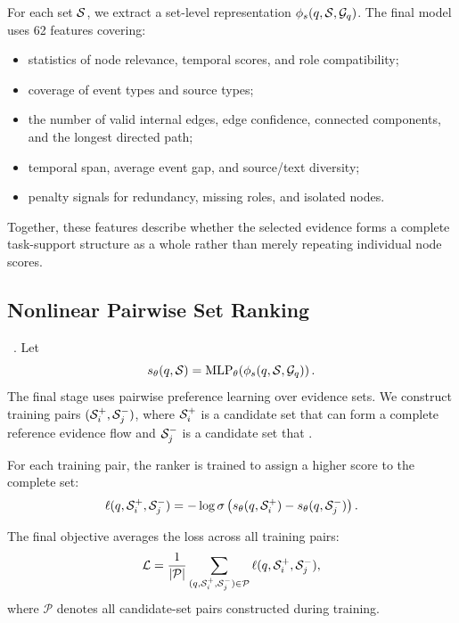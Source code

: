 For each set $\mathcal{S}$, we extract a set-level representation $\phi_s(q,\mathcal{S},\mathcal{G}_q)$. The final model uses 62 features covering:
\begin{itemize}
    \item statistics of node relevance, temporal scores, and role compatibility;
    \item coverage of event types and source types;
    \item the number of valid internal edges, edge confidence, connected components, and the longest directed path;
    \item temporal span, average event gap, and source/text diversity;
    \item penalty signals for redundancy, missing roles, and isolated nodes.
\end{itemize}
Together, these features describe whether the selected evidence forms a complete task-support structure as a whole rather than merely repeating individual node scores.

\subsection{Nonlinear Pairwise Set Ranking}

~\cite{burges2005ranknet}. Let
\begin{equation}
s_{\theta}(q,\mathcal{S})
=
\operatorname{MLP}_{\theta}
\!\left(
\phi_s(q,\mathcal{S},\mathcal{G}_q)
\right).
\end{equation}
The final stage uses pairwise preference learning over evidence sets.  We construct training pairs
$(\mathcal{S}_i^+,\mathcal{S}_j^-)$,
where $\mathcal{S}_i^+$ is a candidate set that can form a complete reference evidence flow and $\mathcal{S}_j^-$ is a candidate set that .

For each training pair, the ranker is trained to assign a higher score to the complete set:
\begin{equation}
\ell(q,\mathcal{S}_i^+,\mathcal{S}_j^-)
=
-\log \sigma\left(
s_{\theta}(q,\mathcal{S}_i^+)
-
s_{\theta}(q,\mathcal{S}_j^-)
\right).
\label{eq:ranknet_pair_loss}
\end{equation}

The final objective averages the loss across all training pairs:
\begin{equation}
\mathcal{L}
=
\frac{1}{|\mathcal{P}|}
\sum_{(q,\mathcal{S}_i^+,\mathcal{S}_j^-)\in\mathcal{P}}
\ell(q,\mathcal{S}_i^+,\mathcal{S}_j^-),
\label{eq:ranknet_loss}
\end{equation}
where $\mathcal{P}$ denotes all candidate-set pairs constructed during training.

